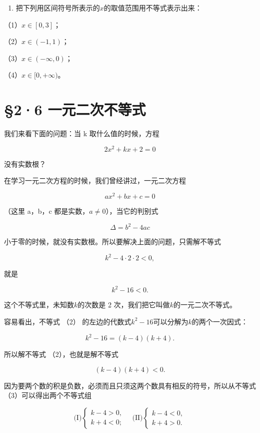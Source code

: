\begin{enumerate}[start=2]
\item
  把下列用区间符号所表示的\(x\)的取值范围用不等式表示出来：
\end{enumerate}

（1）\(x \in [0, 3]\)；

（2）\(x \in (-1, 1)\)；

（3）\(x \in (-\infty, 0)\)；

（4）\(x \in [0, +\infty)\)。

\section{§2·6 一元二次不等式}

我们来看下面的问题：当 k 取什么值的时候，方程

\[
2x^2+kx+2 = 0 \tag {1}
\]

没有实数根？

在学习一元二次方程的时候，我们曾经讲过，一元二次方程

\[
a x^{2} + b x + c = 0
\]

（这里 a，b，c 都是实数，\(a\neq0\)），当它的判别式

\[
\Delta = b^{2} - 4 a c
\]

小于零的时候，就没有实数根。所以要解决上面的问题，只需解不等式

\[
k^{2} - 4 \cdot 2 \cdot 2 < 0,
\]

就是

\[
k^{2} - 16 < 0. \tag {2}
\]

这个不等式里，未知数\(k\)的次数是 2
次，我们把它叫做\(k\)的一元二次不等式。

容易看出，不等式 （2）
的左边的代数式\(k^2 - 16\)可以分解为\(k\)的两个一次因式：

\[
k^{2} - 16 = (k - 4) (k + 4).
\]

所以解不等式 （2），也就是解不等式

\[
(k - 4) (k + 4) < 0. \tag {3}
\]

因为要两个数的积是负数，必须而且只须这两个数具有相反的符号，所以从不等式（3）可以得出两个不等式组

\[
\text{(I)} \left\{ \begin{array}{ll} k - 4 > 0, \\ k + 4 < 0; \end{array} \right. \quad \text{(II)} \left\{ \begin{array}{ll} k - 4 < 0, \\ k + 4 > 0. \end{array} \right.
\]

